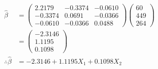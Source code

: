 \documentclass[12pt,a4paper, fleq]{article}
\begin{document}
\begin{itemize}
\begin{equation*}
\begin{split}
\hat{\beta} & =
\begin{pmatrix}
2.2179 & -0.3374 & -0.0610\\
-0.3374 & 0.0691 & −0.0366\\
-0.0610 & −0.0366 & 0.0488
\end{pmatrix}
\begin{pmatrix}
60\\
449\\
264
\end{pmatrix}\\[2mm]
& = \begin{pmatrix}
-2.3146\\
1.1195\\
0.1098
\end{pmatrix}\\[3mm]
\therefore \hat{\beta} & = -2.3146 + 1.1195X_1 + 0.1098X_2
\end{split}
\end{equation*}
\end{itemize}

\end{document}
